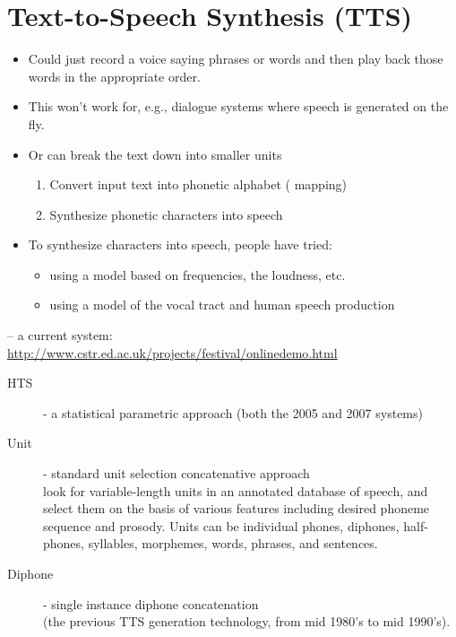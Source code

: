 \documentclass[a4paper,landscape,headrule,footrule,xetex]{foils}
\begin{document}
\section{Text-to-Speech Synthesis (TTS)}

\begin{itemize}
\item Could just record a voice saying phrases or words and then play back those words in the appropriate order.
\item This won't work for, e.g., dialogue systems where speech is generated on the fly.
\item Or can break the text down into smaller units
  \begin{enumerate}
  \item Convert input text into phonetic alphabet ( mapping)
  \item Synthesize phonetic characters into speech 
  \end{enumerate}
\item  To synthesize characters into speech, people have tried:
  \begin{itemize}
  \item using a model based on frequencies, the loudness, etc.
  \item using a model of the vocal tract and human speech production
  \end{itemize}
\end{itemize}


 -- a current  system:
\\ \url{http://www.cstr.ed.ac.uk/projects/festival/onlinedemo.html}

\begin{description}
\item [HTS] - a statistical parametric approach (both the 2005 and 2007 systems)
\item [Unit] - standard unit selection concatenative approach
\\ look for variable-length units in an
annotated database of speech, and select them on the basis of various
features including desired phoneme sequence and prosody.
Units can be individual phones, diphones, half-phones, syllables, morphemes, words, phrases, and sentences. 
\item [Diphone] - single instance diphone concatenation
\\      (the previous TTS generation technology, from mid 1980's to mid 1990's). 
\end{description}
\end{document}
